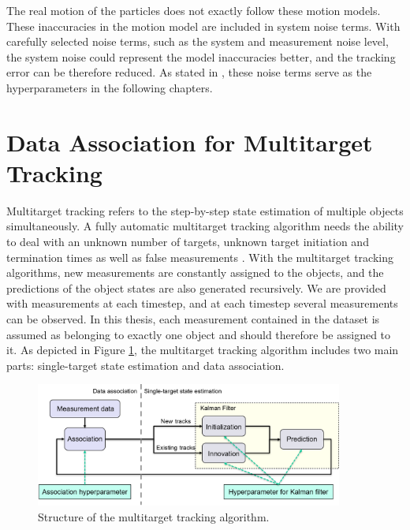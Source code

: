 The real motion of the particles does not exactly follow these motion models. These inaccuracies in the motion model are included in system noise terms. With carefully selected noise terms, such as the system and measurement noise level, the system noise could represent the model inaccuracies better, and the tracking error can be therefore reduced. As stated in , these noise terms serve as the hyperparameters in the following chapters.


\FloatBarrier



\section{Data Association for Multitarget Tracking}

Multitarget tracking refers to the step-by-step state estimation of multiple objects simultaneously. A fully automatic multitarget tracking algorithm needs the ability to deal with an unknown number of targets, unknown target initiation and termination times as well as false measurements \cite{musicki2009multiscan}. With the multitarget tracking algorithms, new measurements are constantly assigned to the objects, and the predictions of the object states are also generated recursively. We are provided with measurements at each timestep, and at each timestep several measurements can be observed. In this thesis, each measurement contained in the dataset is assumed as belonging to exactly one object and should therefore be assigned to it. As depicted in Figure \ref{tracking system}, the multitarget tracking algorithm includes two main parts: single-target state estimation and data association.

\begin{figure}[htbp]
\centering
\includegraphics[width=0.9\textwidth]{figures/tracking system.png}
\caption{Structure of the multitarget tracking algorithm.}
\label{tracking system}
\end{figure}

